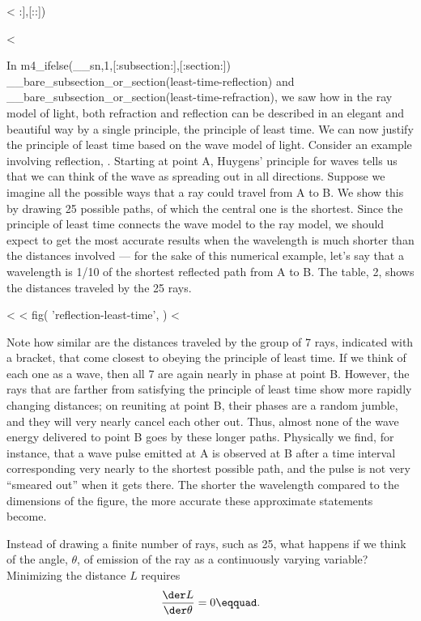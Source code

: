 <%
:],[::]) %

<%

In m4_ifelse(__sn,1,[:subsection:],[:section:]) 
__bare_subsection_or_section(least-time-reflection) 
and
__bare_subsection_or_section(least-time-refraction),
we saw how in the ray model of
light, both refraction and reflection can be described in an
elegant and beautiful way by a single principle, the
principle of least time. We can now justify the principle of
least time based on the wave model of light. Consider an
example involving reflection, . Starting at point A,
Huygens' principle for waves tells us that we can think of
the wave as spreading out in all directions. Suppose we
imagine all the possible ways that a ray could travel from A
to B. We show this by drawing 25 possible paths, of which
the central one is the shortest. Since the principle of
least time connects the wave model to the ray model, we
should expect to get the most accurate results when the
wavelength is much shorter than the distances involved ---
for the sake of this numerical example, let's say that a
wavelength is 1/10 of the shortest reflected path from A to
B. The table, 2, shows the distances traveled by the 25 rays.

<%
<%
  fig(
    'reflection-least-time',
  )
<%

Note how similar are the distances traveled by the group of
7 rays, indicated with a bracket, that come closest to
obeying the principle of least time. If we think of each one
as a wave, then all 7 are again nearly in phase at point
B. However, the rays that are farther from satisfying the
principle of least time show more rapidly changing
distances; on reuniting at point B, their phases are a
random jumble, and they will very nearly cancel each other
out. Thus, almost none of the wave energy delivered to point
B goes by these longer paths. Physically we find, for
instance, that a wave pulse emitted at A is observed at B
after a time interval corresponding very nearly to the
shortest possible path, and the pulse is not very ``smeared
out'' when it gets there. The shorter the wavelength
compared to the dimensions of the figure, the more accurate
these approximate statements become.

Instead of drawing a finite number of rays, such as 25, what
happens if we think of the angle, $\theta $, of emission of
the ray as a continuously varying variable? Minimizing the
distance $L$ requires
\begin{equation*}
        \frac{\der L}{\der\theta} = 0\eqquad.
\end{equation*}


